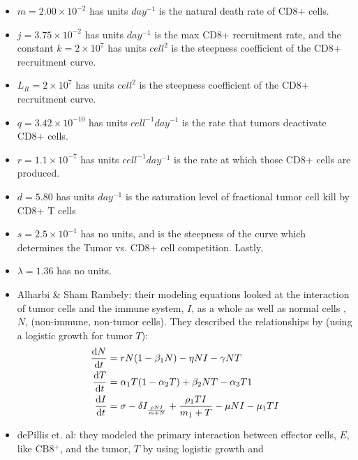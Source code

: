 \documentclass[11pt]{amsart}
\begin{document}
\begin{itemize}
\begin{itemize}
\begin{itemize}
                    \item $m = 2.00 \times 10^{-2}$ has units $day^{-1}$ is the natural death rate of CD8+ cells.
                    \item $j = 3.75 \times 10^{-2}$ has units $day^{-1}$ is the max CD8+ recruitment rate, and the constant $k = 2 \times 10^7$ has units $cell^2$ is the steepness coefficient of the CD8+ recruitment curve.
                    \item $L_R = 2 \times 10^7$ has units $cell^2$ is the steepness coefficient of the CD8+ recruitment curve.
                    \item $q = 3.42 \times 10^{-10}$ has units $cell^{-1}day^{-1}$ is the rate that tumors deactivate CD8+ cells.
                    \item $r =1.1 \times 10^{-7} $ has units $cell^{-1}day^{-1}$ is the rate at which those CD8+ cells are produced. 
                    \item $d = 5.80$ has units $day^{-1}$ is the saturation level of fractional tumor cell kill by CD8+ T cells
                    \item $s = 2.5 \times 10^{-1}$ has no units, and is the steepness of the curve which determines the Tumor vs. CD8+ cell competition. Lastly, \item $\lambda = 1.36$ has no units. 
			\item Alharbi \& Sham Rambely: their modeling equations looked at the interaction of tumor cells and the immune system, $I$, as a whole as well as normal cells , $N$, (non-immune, non-tumor cells). They described the relationships by (using a logistic growth for tumor $T$):
				\begin{eqnarray}
					\begin{aligned}
						\frac{\mathop{}\!\mathrm{d} N}{\mathop{}\!\mathrm{d} t} &= rN(1-\beta_1 N) - \eta NI - \gamma NT \\
						\frac{\mathop{}\!\mathrm{d} T}{\mathop{}\!\mathrm{d} t} &= \alpha_1T(1-\alpha_2T) + \beta_2 NT - \alpha_3 T1 \\
						\frac{\mathop{}\!\mathrm{d} I}{\mathop{}\!\mathrm{d} t} &= \sigma - \delta I _ \frac{\rho N I}{m+N} + \frac{\rho_1 TI}{m_1 + T} - \mu NI - \mu_1 TI \label{eq: AlharbiTumorImmuno}
					\end{aligned}
				\end{eqnarray}
			\item dePillis et. al: they modeled the primary interaction between effector cells, $E$, like CB8$^+$, and the tumor, $T$ by using logistic growth and 
				\begin{eqnarray}
					\begin{aligned}

\end{aligned}
\end{eqnarray}
\end{itemize}
\end{itemize}
\end{itemize}
\end{document}
